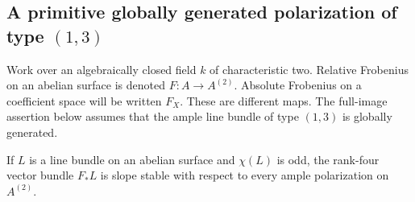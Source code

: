 \subsection{A primitive globally generated polarization of type \((1,3)\)}

Work over an algebraically closed field \(k\) of characteristic two.
Relative Frobenius on an abelian surface is denoted
\(F:A\to A^{(2)}\). Absolute Frobenius on a coefficient space
will be written \(F_X\). These are different maps.
The full-image assertion below assumes that the ample line bundle
of type \((1,3)\) is globally generated.

\begin{lemma}
\label{lem:DE-odd-line-Frobenius-stable}
If \(L\) is a line bundle on an abelian surface and \(\chi(L)\)
is odd, the rank-four vector bundle \(F_*L\) is slope stable
with respect to every ample polarization on \(A^{(2)}\).
\end{lemma}
